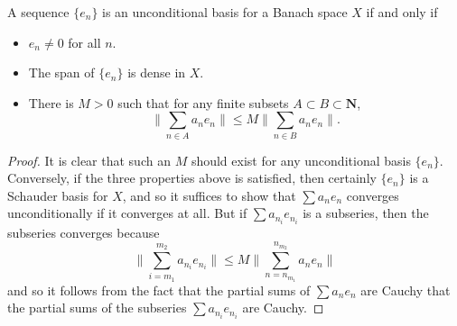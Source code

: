 \begin{theorem}
    A sequence $\{ e_n \}$ is an unconditional basis for a Banach space $X$ if and only if
    \begin{itemize}
        \item $e_n \neq 0$ for all $n$.
        \item The span of $\{ e_n \}$ is dense in $X$.
        \item There is $M > 0$ such that for any finite subsets $A \subset B \subset \mathbf{N}$,
        \[ \| \sum_{n \in A} a_n e_n \| \leq M \| \sum_{n \in B} a_n e_n \|. \]
    \end{itemize}
\end{theorem}
\begin{proof}
    It is clear that such an $M$ should exist for any unconditional basis $\{ e_n \}$. Conversely, if the three properties above is satisfied, then certainly $\{ e_n \}$ is a Schauder basis for $X$, and so it suffices to show that $\sum a_n e_n$ converges unconditionally if it converges at all. But if $\sum a_{n_i} e_{n_i}$ is a subseries, then the subseries converges because
    \[ \| \sum_{i = m_1}^{m_2} a_{n_i} e_{n_i} \| \leq M \| \sum_{n = n_{m_1}}^{n_{m_2}} a_n e_n \| \]
    and so it follows from the fact that the partial sums of $\sum a_n e_n$ are Cauchy that the partial sums of the subseries $\sum a_{n_i} e_{n_i}$ are Cauchy.
\end{proof}

